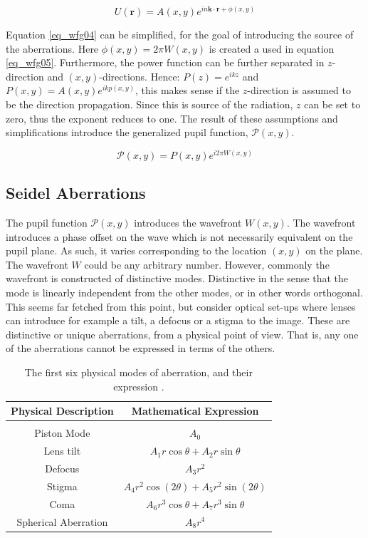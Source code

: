 \documentclass{article}
\begin{document}
\begin{equation}
\label{eq_wfg04}
U(\textbf{r}) = A(x,y) e^{i n \textbf{k} \cdot \textbf{r} + \phi(x,y)}
\end{equation}

Equation \ref{eq_wfg04} can be simplified, for the goal of introducing the source of the aberrations. Here $\phi(x,y) = 2\pi W(x,y)$ is created a used in equation \ref{eq_wfg05}. Furthermore, the power function can be further separated in $z$-direction and $(x,y)$-directions. Hence: $P(z) = e^{i k z}$ and $P(x,y) = A(x,y) e^{i k p(x,y)}$, this makes sense if the $z$-direction is assumed to be the direction propagation. Since this is source of the radiation, $z$ can be set to zero, thus the exponent reduces to one. The result of these assumptions and simplifications introduce the generalized pupil function, $\mathcal{P}(x,y)$.

\begin{equation}
\label{eq_wfg05}
\mathcal{P}(x,y) = P(x,y) e^{i 2\pi W(x,y)}
\end{equation}

\subsection{Seidel Aberrations}
The pupil function $\mathcal{P}(x,y)$ introduces the wavefront $W(x,y)$. The wavefront introduces a phase offset on the wave which is not necessarily equivalent on the pupil plane. As such, it varies corresponding to the location $(x,y)$ on the plane. 
The wavefront $W$ could be any arbitrary number. However, commonly the wavefront is constructed of distinctive modes. Distinctive in the sense that the mode is linearly independent from the other modes, or in other words orthogonal.
This seems far fetched from this point, but consider optical set-ups where lenses can introduce for example a tilt, a defocus or a stigma to the image. These are distinctive or unique aberrations, from a physical point of view. That is, any one of the aberrations cannot be expressed in terms of the others.

\begin{table}[H]
\center
\begin{tabular}{c c}
Physical Description & Mathematical Expression\\
\hline \\
Piston Mode & $A_0$ \\
Lens tilt & $A_1 r \cos \theta + A_2 r \sin \theta$ \\
Defocus & $A_3 r^2$ \\
Stigma & $A_4 r^2 \cos(2\theta) + A_5 r^2 \sin(2\theta)$ \\
Coma & $A_6 r^3 \cos\theta + A_7 r^3 \sin\theta$ \\
Spherical Aberration & $A_8 r^4$
\end{tabular}
\caption{The first six physical modes of aberration, and their expression \cite{zernikeMatlabPag}.}
\label{tab_wfg01}
\end{table}
\end{document}
